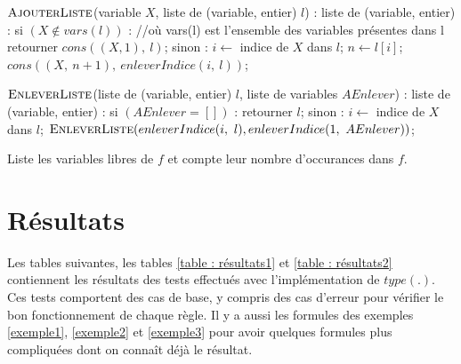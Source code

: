 \documentclass{rapport}
\theoremstyle{plain}
\theoremstyle{remark}
\theoremstyle{definition}
\begin{document}
\begin{algorithm}[H]
\begin{PseudoCode}
$\textsc{AjouterListe}$(variable $X$, liste de (variable, entier) $l$) :
	liste de (variable, entier) :
si $(X \notin vars(l))$ :			//où vars(l) est l'ensemble des variables présentes dans l
    retourner $cons((X, 1),\ l)$;
sinon :
    $i \leftarrow$ indice de $X$ dans $l$;
    $n \leftarrow l[i]$;
    $cons((X,\ n + 1),\ enleverIndice(i,\ l))$;
    
$\textsc{EnleverListe}$(liste de (variable, entier) $l$, liste de variables $AEnlever$) :
	liste de (variable, entier) :
si $(AEnlever = [])$ :
    retourner $l$;
sinon :
    $i \leftarrow$ indice de $X$ dans $l$;
    $\textsc{EnleverListe}(enleverIndice(i,\ l), enleverIndice(1,\ AEnlever))$;
  \end{PseudoCode}
  \caption{Liste les variables libres de $f$ et compte leur nombre d'occurances dans $f$.}
\label{algo:varLibres}
\end{algorithm}

\section{Résultats}

Les tables suivantes, les tables \ref{table : résultats1} et \ref{table : résultats2} contiennent les résultats des tests effectués avec l'implémentation de $type(.)$. Ces tests comportent des cas de base, y compris des cas d'erreur pour vérifier le bon fonctionnement de chaque règle. Il y a aussi les formules des exemples \ref{exemple1}, \ref{exemple2} et \ref{exemple3} pour avoir quelques formules plus compliquées dont on connaît déjà le résultat. 
\end{document}
